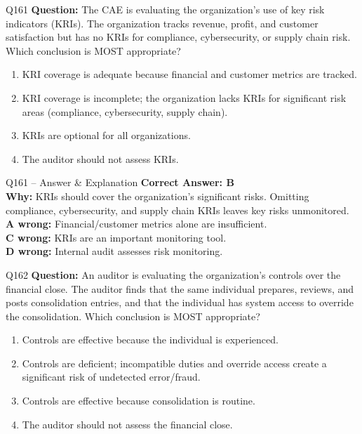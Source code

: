 \documentclass[aspectratio=169,10pt]{beamer}
\begin{document}
	\begin{frame}[t]{Q161}
		\small
		\textbf{Question:} The CAE is evaluating the organization's use of key risk indicators (KRIs). The organization tracks revenue, profit, and customer satisfaction but has no KRIs for compliance, cybersecurity, or supply chain risk. Which conclusion is MOST appropriate?
		\begin{enumerate}[label=\Alph*.,itemsep=1pt,topsep=2pt]
			\item KRI coverage is adequate because financial and customer metrics are tracked.
			\item KRI coverage is incomplete; the organization lacks KRIs for significant risk areas (compliance, cybersecurity, supply chain).
			\item KRIs are optional for all organizations.
			\item The auditor should not assess KRIs.
		\end{enumerate}
	\end{frame}
	
	\begin{frame}[t]{Q161 -- Answer \& Explanation}
		\small
		\textbf{Correct Answer: B} \\[4pt]
		\textbf{Why:} KRIs should cover the organization's significant risks. Omitting compliance, cybersecurity, and supply chain KRIs leaves key risks unmonitored. \\[4pt]
		\textbf{A wrong:} Financial/customer metrics alone are insufficient. \\[2pt]
		\textbf{C wrong:} KRIs are an important monitoring tool. \\[2pt]
		\textbf{D wrong:} Internal audit assesses risk monitoring.
	\end{frame}
	
	\begin{frame}[t]{Q162}
		\small
		\textbf{Question:} An auditor is evaluating the organization's controls over the financial close. The auditor finds that the same individual prepares, reviews, and posts consolidation entries, and that the individual has system access to override the consolidation. Which conclusion is MOST appropriate?
		\begin{enumerate}[label=\Alph*.,itemsep=1pt,topsep=2pt]
			\item Controls are effective because the individual is experienced.
			\item Controls are deficient; incompatible duties and override access create a significant risk of undetected error/fraud.
			\item Controls are effective because consolidation is routine.
			\item The auditor should not assess the financial close.
		\end{enumerate}
	\end{frame}
	
\end{document}
